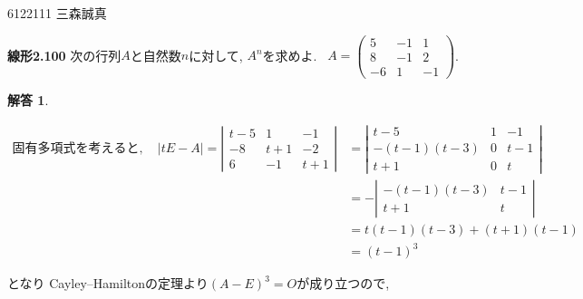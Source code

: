 \documentclass{jsarticle}
\newtheorem*{answer*}{解答}
\begin{document}
\begin{flushright}
6122111 三森誠真
\end{flushright}

\begin{itembox}[l]{\textbf{線形2.100}}
次の行列$A$と自然数$n$に対して, $A^n$を求めよ. \ 
$A=\left(\begin{array}{ccc}
5 & -1 & 1 \\
8 & -1 & 2 \\
-6 & 1 & -1
\end{array}\right)$.
\end{itembox}

\begin{answer*}
\end{answer*}
$$
\begin{aligned}
固有多項式を考えると, \quad|t E-A|=\left|\begin{array}{ccc}
t-5 & 1 & -1 \\
-8 & t+1 & -2 \\
6 & -1 & t+1
\end{array}\right| & =\left|\begin{array}{ccc}
t-5 & 1 & -1 \\
-(t-1)(t-3) & 0 & t-1 \\
t+1 & 0 & t
\end{array}\right| \\
 & =-\left|\begin{array}{cc}
-(t-1)(t-3) & t-1 \\
t+1 & t
\end{array}\right| \\
 \quad & =t(t-1)(t-3)+(t+1)(t-1) \\
& =(t-1)^3
\end{aligned}
$$



となり Cayley–Hamiltonの定理より$(A-E)^3=O$が成り立つので, 
\end{document}

